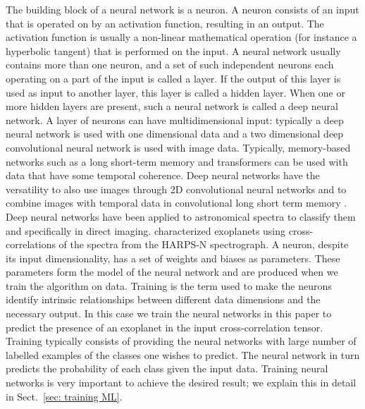 \documentclass{aa}
\begin{document}
The building block of a neural network is a neuron.
A neuron consists of an input that is operated on by an activation function, resulting in an output.
The activation function is usually a non-linear mathematical operation (for instance a hyperbolic tangent) that is performed on the input.
A neural network usually contains more than one neuron, and a set of such independent neurons each operating on a part of the input is called a layer. 
If the output of this layer is used as input to another layer, this layer is called a hidden layer.
When one or more hidden layers are present, such a neural network is called a deep neural network.
A layer of neurons can have multidimensional input: typically a deep neural network is used with one dimensional data and a two dimensional deep convolutional neural network is used with image data.
Typically, memory-based networks such as a long short-term memory and transformers can be used with data that have some temporal coherence.
Deep neural networks have the versatility to also use images through 2D convolutional neural networks \citep[CNN,][]{shi2015convolutional} and to combine images with temporal data in convolutional long short term memory \citep[convLSTM,][]{1997HocherieterLSTM,2022convLSTM}.
Deep neural networks have been applied to astronomical spectra \citep[e.g.][]{2019Leung,2020Tao} to classify them and specifically in direct imaging.
\citet{2020Fisher} characterized exoplanets using cross-correlations of the spectra from the HARPS-N spectrograph. A neuron, despite its input dimensionality, has a set of weights and biases as parameters. 
These parameters form the model of the neural network and are produced when we train the algorithm on data.
Training is the term used to make the neurons identify intrinsic relationships between different data dimensions and the necessary output.
In this case we train the neural networks in this paper to predict the presence of an exoplanet in the input cross-correlation tensor.
Training typically consists of providing the neural networks with large number of labelled examples of the classes one wishes to predict.
The neural network in turn predicts the probability of each class given the input data.
Training neural networks is very important to achieve the desired result; we explain this in detail in Sect.~\ref{sec: training ML}.
\end{document}
